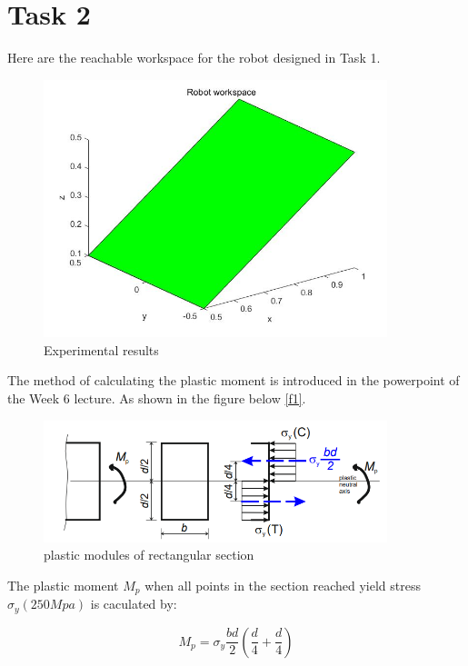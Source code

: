 \section{Task 2}
\FloatBarrier %

Here are the reachable workspace for the robot designed in Task 1.


\begin{figure}[htbp]
    \centering
    \includegraphics[width=10cm]{./fig/workspace.jpg}
    \caption{Experimental results}
    \label{f5}
\end{figure}



\newpage
\iffalse
The method of calculating the plastic moment is introduced in the powerpoint of the Week 6 lecture. As shown in the figure below \autoref{f1}.

\begin{figure}
    \centering
    \includegraphics[width=10cm]{./fig/11.png}
    \caption{plastic modules of rectangular section  }
    \label{f1}
\end{figure}

The plastic moment $M_p$ when all points in the section reached
yield stress $\sigma_y(250Mpa)$ is caculated by:

\begin{equation} 
    M_p=\sigma_y\frac{bd}{2}(\frac{d}{4}+\frac{d}{4})
    \label{e1}
\end{equation}

